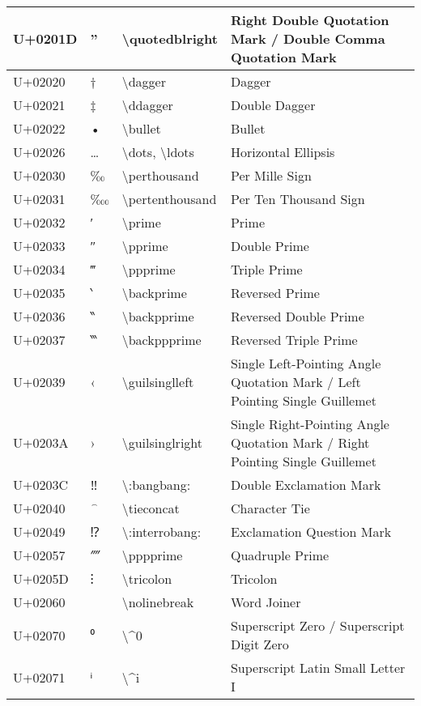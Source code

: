 \begin{table}[h]
\begin{tabulary}{\linewidth}{|L|L|L|L|}
\hline
U+0201D & ” & {\textbackslash}quotedblright & Right Double Quotation Mark / Double Comma Quotation Mark \\
\hline
U+02020 & † & {\textbackslash}dagger & Dagger \\
\hline
U+02021 & ‡ & {\textbackslash}ddagger & Double Dagger \\
\hline
U+02022 & • & {\textbackslash}bullet & Bullet \\
\hline
U+02026 & … & {\textbackslash}dots, {\textbackslash}ldots & Horizontal Ellipsis \\
\hline
U+02030 & ‰ & {\textbackslash}perthousand & Per Mille Sign \\
\hline
U+02031 & ‱ & {\textbackslash}pertenthousand & Per Ten Thousand Sign \\
\hline
U+02032 & ′ & {\textbackslash}prime & Prime \\
\hline
U+02033 & ″ & {\textbackslash}pprime & Double Prime \\
\hline
U+02034 & ‴ & {\textbackslash}ppprime & Triple Prime \\
\hline
U+02035 & ‵ & {\textbackslash}backprime & Reversed Prime \\
\hline
U+02036 & ‶ & {\textbackslash}backpprime & Reversed Double Prime \\
\hline
U+02037 & ‷ & {\textbackslash}backppprime & Reversed Triple Prime \\
\hline
U+02039 & ‹ & {\textbackslash}guilsinglleft & Single Left-Pointing Angle Quotation Mark / Left Pointing Single Guillemet \\
\hline
U+0203A & › & {\textbackslash}guilsinglright & Single Right-Pointing Angle Quotation Mark / Right Pointing Single Guillemet \\
\hline
U+0203C & ‼ & {\textbackslash}:bangbang: & Double Exclamation Mark \\
\hline
U+02040 & ⁀ & {\textbackslash}tieconcat & Character Tie \\
\hline
U+02049 & ⁉ & {\textbackslash}:interrobang: & Exclamation Question Mark \\
\hline
U+02057 & ⁗ & {\textbackslash}pppprime & Quadruple Prime \\
\hline
U+0205D & ⁝ & {\textbackslash}tricolon & Tricolon \\
\hline
U+02060 & ⁠ & {\textbackslash}nolinebreak & Word Joiner \\
\hline
U+02070 & ⁰ & {\textbackslash}{\textasciicircum}0 & Superscript Zero / Superscript Digit Zero \\
\hline
U+02071 & ⁱ & {\textbackslash}{\textasciicircum}i & Superscript Latin Small Letter I \\

\end{tabulary}
\end{table}

